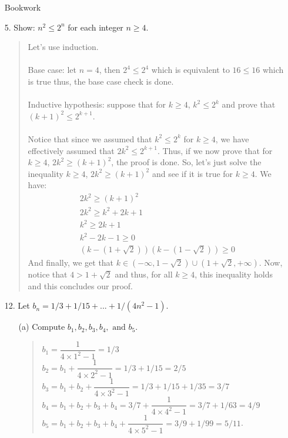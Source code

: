 \documentclass[12pt, a4paper]{article}                      %
\begin{document}
\begin{itemize}
\newpage
{\Large Bookwork}
\item[]
\item[5.]
Show: $n^2 \leq 2^n$ for each integer $n \geq 4$.
\begin{quote}
Let's use induction.\\\\
Base case: let $n = 4$, then $2^4 \leq 2^4$ which is equivalent to $16 \leq 16$ which is true
thus, the base case check is done.\\\\
Inductive hypothesis: suppose that for $k \geq 4$, $k^2 \leq 2^k$ and prove that $(k + 1)^2 \leq 2^{k + 1}$.\\\\
Notice that since we assumed that $k^2 \leq 2^k$ for $k \geq 4$, we have effectively assumed that $2k^2 \leq 2^{k + 1}$.
Thus, if we now prove that for $k \geq 4$, $2k^2 \geq (k + 1)^2$, the proof is done. So, let's just solve the inequality $k \geq 4$, $2k^2 \geq (k + 1)^2$
and see if it is true for $k \geq 4$. We have:
\begin{align}
2k^2 \geq (k + 1)^2\\
2k^2 \geq k^2 + 2k + 1\\
k^2 \geq 2k + 1\\
k^2 - 2k - 1 \geq 0\\
(k - (1 + \sqrt{2}))(k - (1 - \sqrt{2})) \geq 0
\end{align}
And finally, we get that $k \in (-\infty, 1 - \sqrt{2}) \cup (1 + \sqrt{2}, +\infty)$.
Now, notice that $4 > 1 + \sqrt{2}$ and thus, for all $k \geq 4$, this inequality holds
and this concludes our proof.
\end{quote}

\item[]
\item[12.]
Let $b_n = 1/3 + 1/15 + ... + 1/(4n^2 - 1)$.
\begin{itemize}
\item[(a)]
Compute $b_1, b_2, b_3, b_4, \mbox{ and } b_5$.
\begin{quote}
$b_1 = \dfrac{1}{4 \times 1^2 - 1} = 1/3$\\
$b_2 = b_1 + \dfrac{1}{4 \times 2^2 - 1} = 1/3 + 1/15 = 2/5$\\
$b_3 = b_1 + b_2 + \dfrac{1}{4 \times 3^2 - 1} = 1/3 + 1/15 + 1/35 = 3/7$\\
$b_4 = b_1 + b_2 + b_3 + b_4 = 3/7 + \dfrac{1}{4 \times 4^2 - 1} = 3/7 + 1/63 = 4/9$\\
$b_5 = b_1 + b_2 + b_3 + b_4 + \dfrac{1}{4 \times 5^2 - 1} = 3/9 + 1/99 = 5/11$.
\end{quote}


\end{itemize}
\end{itemize}
\end{document}
